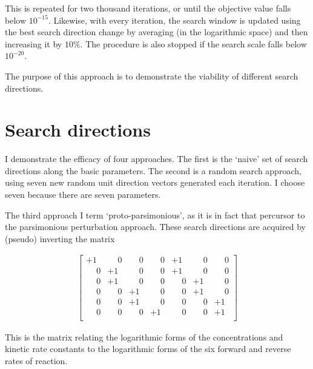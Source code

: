 \documentclass{article}
\begin{document}
This is repeated for two thousand iterations, or until the objective value falls below \(10^{-15}\).  Likewise, with every iteration, the search window is updated using the best search direction change by averaging (in the logarithmic space) and then increasing it by \(10\%\).  The procedure is also stopped if the search scale falls below \(10^{-20}\).

The purpose of this approach is to demonstrate the viability of different search directions.

\section{Search directions}

I demonstrate the efficacy of four approaches.  The first is the `naive' set of search directions along the basic parameters.  The second is a random search approach, using seven new random unit direction vectors generated each iteration.  I choose seven because there are seven parameters.

The third approach I term `proto-parsimonious', as it is in fact that percursor to the parsimonious perturbation approach.  These search directions are acquired by (pseudo) inverting the matrix

\begin{align}
\begin{bmatrix}
+1 & \phantom{\pm}0 & \phantom{\pm}0 & \phantom{\pm}0 & +1 & \phantom{\pm}0 & \phantom{\pm}0 \\
\phantom{\pm}0 & +1 & \phantom{\pm}0 & \phantom{\pm}0 & +1 & \phantom{\pm}0 & \phantom{\pm}0 \\
\phantom{\pm}0 & +1 & \phantom{\pm}0 & \phantom{\pm}0 & \phantom{\pm}0 & +1 & \phantom{\pm}0 \\
\phantom{\pm}0 & \phantom{\pm}0 & +1 & \phantom{\pm}0 & \phantom{\pm}0 & +1 & \phantom{\pm}0 \\
\phantom{\pm}0 & \phantom{\pm}0 & +1 & \phantom{\pm}0 & \phantom{\pm}0 & \phantom{\pm}0 & +1 \\
\phantom{\pm}0 & \phantom{\pm}0 & \phantom{\pm}0 & +1 & \phantom{\pm}0 & \phantom{\pm}0 & +1 \\
\end{bmatrix}
\end{align}

This is the matrix relating the logarithmic forms of the concentrations and kinetic rate constants to the logarithmic forms of the six forward and reverse rates of reaction.
\end{document}

